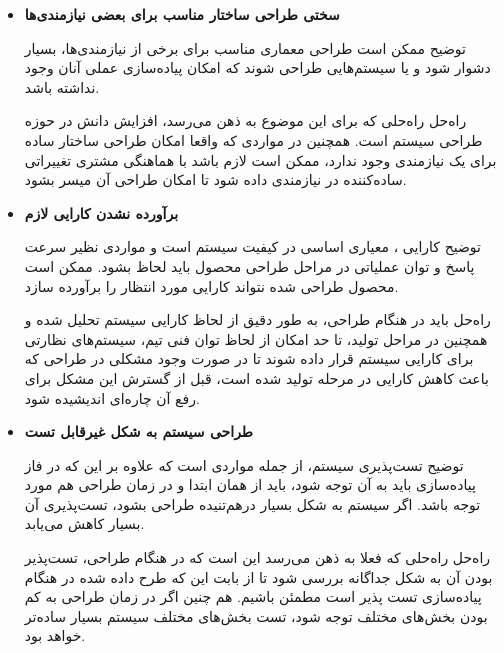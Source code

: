 \begin{itemize}
	\item 
	\textbf{سختی طراحی ساختار مناسب برای بعضی نیازمندی‌ها}
	
	توضیح \hspace*{1cm} 
	ممکن است طراحی معماری مناسب برای برخی از نیازمندی‌ها، بسیار دشوار شود و یا سیستم‌هایی طراحی شوند که امکان پیاده‌سازی عملی آنان وجود نداشته باشد.
	
		
	راه‌حل \hspace*{1cm} 
	راه‌حلی که برای این موضوع به ذهن می‌رسد، افزایش دانش در حوزه طراحی سیستم است. همچنین در مواردی که واقعا امکان طراحی ساختار ساده برای یک نیازمندی وجود ندارد، ممکن است لازم باشد با هماهنگی مشتری تغییراتی ساده‌کننده در نیازمندی داده شود تا امکان طراحی آن میسر بشود.

	
	
		\item 
	\textbf{برآورده نشدن کارایی لازم}
	
	
		توضیح \hspace*{1cm} 
	کارایی
	، 
	 معیاری اساسی در کیفیت سیستم است و مواردی نظیر سرعت پاسخ و توان عملیاتی در مراحل طراحی محصول باید لحاظ بشود. ممکن است محصول طراحی شده نتواند کارایی مورد انتظار را برآورده سازد.
	
	راه‌حل \hspace*{1cm} 
	باید در هنگام طراحی، به طور دقیق از لحاظ کارایی سیستم تحلیل شده و همچنین در مراحل تولید، تا حد امکان از لحاظ توان فنی تیم، سیستم‌های نظارتی برای کارایی سیستم قرار داده شوند تا در صورت وجود مشکلی در طراحی که باعث کاهش کارایی در مرحله تولید شده است، قبل از گسترش این مشکل برای رفع آن چاره‌ای اندیشیده شود.
	
	\item
	\textbf{طراحی سیستم به شکل غیرقابل تست}
	
	توضیح \hspace*{1cm} 
	تست‌پذیری سیستم، از جمله مواردی است که علاوه بر این که در فاز پیاده‌سازی باید به آن توجه شود، باید از همان ابتدا و در زمان طراحی هم مورد توجه باشد. اگر سیستم به شکل بسیار در‌هم‌تنیده طراحی بشود، تست‌پذیری آن بسیار کاهش می‌یابد.
	
	
	راه‌حل \hspace*{1cm} 
	راه‌حلی که فعلا به ذهن می‌رسد این است که در هنگام طراحی، تست‌پذیر بودن آن به شکل جداگانه بررسی شود تا از بابت این که طرح داده شده در هنگام پیاده‌سازی تست پذیر است مطمئن باشیم. هم چنین اگر در زمان طراحی به کم بودن
	بخش‌های مختلف توجه شود، تست بخش‌های مختلف سیستم بسیار ساده‌تر خواهد بود.
	
\end{itemize}

